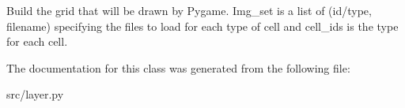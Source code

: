 \begin{DoxyVerb}Build the grid that will be drawn by Pygame. Img_set is a list
of (id/type, filename) specifying the files to load for each type
of cell and cell_ids is the type for each cell.
\end{DoxyVerb}
 

The documentation for this class was generated from the following file\+:\begin{DoxyCompactItemize}
\item 
src/layer.\+py\end{DoxyCompactItemize}
